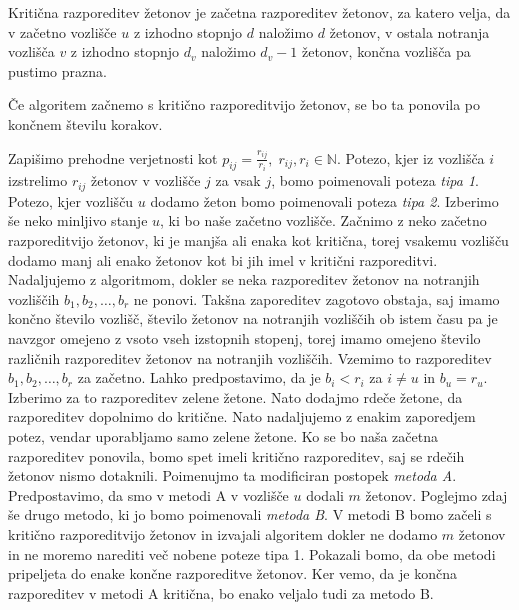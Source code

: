 \documentclass[twoside,11pt]{article}
\begin{document}
\begin{definicija}\label{kritična razporeditev}
    Kritična razporeditev žetonov je začetna razporeditev žetonov, za katero velja, da v začetno vozlišče $u$ z izhodno stopnjo $d$ naložimo $d$ žetonov, v ostala notranja vozlišča $v$ z izhodno stopnjo $d_{v}$ naložimo $d_{v} - 1$ žetonov, končna vozlišča pa pustimo prazna.
\end{definicija}

\begin{trditev}\label{končnost}
    Če algoritem začnemo s kritično razporeditvijo žetonov, se bo ta ponovila po končnem številu korakov.
\end{trditev}

 Zapišimo prehodne verjetnosti kot $p_{ij} = \frac{r_{ij}}{r_{i}},\; r_{ij}, r_{i}\in \mathbb{N}$. Potezo, kjer iz vozlišča $i$ izstrelimo $r_{ij}$ žetonov v vozlišče $j$ za vsak $j$, bomo poimenovali poteza \emph{tipa 1}. Potezo, kjer vozlišču $u$ dodamo žeton bomo poimenovali poteza \emph{tipa 2}. Izberimo še neko minljivo stanje $u$, ki bo naše začetno vozlišče. Začnimo z neko začetno razporeditvijo žetonov, ki je manjša ali enaka kot kritična, torej vsakemu vozlišču dodamo manj ali enako žetonov kot bi jih imel v kritični razporeditvi. Nadaljujemo z algoritmom, dokler se neka razporeditev žetonov na notranjih vozliščih $b_{1},b_{2},\ldots,b_{r}$ ne ponovi. Takšna zaporeditev zagotovo obstaja, saj imamo končno število vozlišč, število žetonov na notranjih vozliščih ob istem času pa je navzgor omejeno z vsoto vseh izstopnih stopenj, torej imamo omejeno število različnih razporeditev žetonov na notranjih vozliščih. Vzemimo to razporeditev $b_{1},b_{2},\ldots,b_{r}$ za začetno. Lahko predpostavimo, da je $b_{i}<r_{i}$ za $i \neq u$ in $b_{u} = r_{u}$. Izberimo za to razporeditev zelene žetone. Nato dodajmo rdeče žetone, da razporeditev dopolnimo do kritične. Nato nadaljujemo z enakim zaporedjem potez, vendar uporabljamo samo zelene žetone. Ko se bo naša začetna razporeditev ponovila, bomo spet imeli kritično razporeditev, saj se rdečih žetonov nismo dotaknili. Poimenujmo ta modificiran postopek \emph{metoda A}. 
Predpostavimo, da smo v metodi A v vozlišče $u$ dodali $m$ žetonov. Poglejmo zdaj še drugo metodo, ki jo bomo poimenovali \emph{metoda B}. V metodi B bomo začeli s kritično razporeditvijo žetonov in izvajali algoritem dokler ne dodamo $m$ žetonov in ne moremo narediti več nobene poteze tipa 1. Pokazali bomo, da obe metodi pripeljeta do enake končne razporeditve žetonov. Ker vemo, da je končna razporeditev v metodi A kritična, bo enako veljalo tudi za metodo B. \newline
\end{document}
